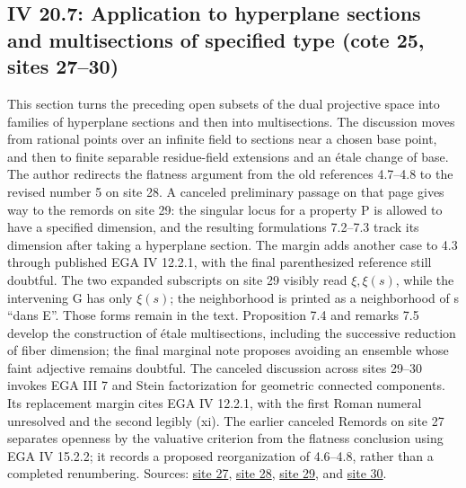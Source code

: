 \documentclass[10pt,a4paper]{article}
\begin{document}
\subsection*{IV 20.7: Application to hyperplane sections and multisections of specified type (cote 25, sites 27--30)}
This section turns the preceding open subsets of the dual projective space into families of hyperplane sections and then into multisections. The discussion moves from rational points over an infinite field to sections near a chosen base point, and then to finite separable residue-field extensions and an étale change of base. The author redirects the flatness argument from the old references 4.7--4.8 to the revised number 5 on site 28. A canceled preliminary passage on that page gives way to the remords on site 29: the singular locus for a property P is allowed to have a specified dimension, and the resulting formulations 7.2--7.3 track its dimension after taking a hyperplane section. The margin adds another case to 4.3 through published EGA IV 12.2.1, with the final parenthesized reference still doubtful. The two expanded subscripts on site 29 visibly read $\xi,\xi(s)$, while the intervening G has only $\xi(s)$; the neighborhood is printed as a neighborhood of s ``dans E''. Those forms remain in the text. Proposition 7.4 and remarks 7.5 develop the construction of étale multisections, including the successive reduction of fiber dimension; the final marginal note proposes avoiding an ensemble whose faint adjective remains doubtful. The canceled discussion across sites 29--30 invokes EGA III 7 and Stein factorization for geometric connected components. Its replacement margin cites EGA IV 12.2.1, with the first Roman numeral unresolved and the second legibly (xi). The earlier canceled Remords on site 27 separates openness by the valuative criterion from the flatness conclusion using EGA IV 15.2.2; it records a proposed reorganization of 4.6--4.8, rather than a completed renumbering. Sources: \href{https://grothendieck.umontpellier.fr/web/viewer.html?file=../25.pdf\#page=28}{site 27}, \href{https://grothendieck.umontpellier.fr/web/viewer.html?file=../25.pdf\#page=29}{site 28}, \href{https://grothendieck.umontpellier.fr/web/viewer.html?file=../25.pdf\#page=30}{site 29}, and \href{https://grothendieck.umontpellier.fr/web/viewer.html?file=../25.pdf\#page=31}{site 30}.
\par{}

\par{}
\end{document}
